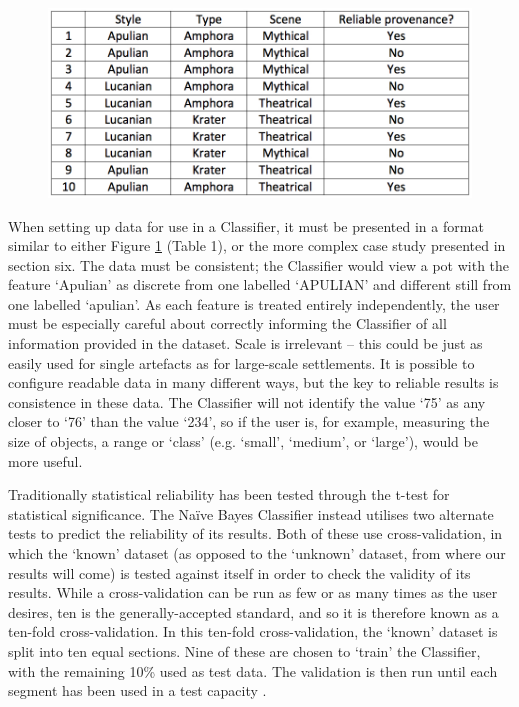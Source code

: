 	\begin{figure}[!htb]
		\includegraphics[width=\linewidth]{figures/thoeming_Table1}
		\label{fig:Table1}
	\end{figure}
	When setting up data for use in a Classifier, it must be presented in a format similar to either Figure \ref{fig:Table1} (Table 1), or the more complex case study presented in section six. The data must be consistent; the Classifier would view a pot with the feature ‘Apulian’ as discrete from one labelled ‘APULIAN’ and different still from one labelled ‘apulian’. As each feature is treated entirely independently, the user must be especially careful about correctly informing the Classifier of all information provided in the dataset. Scale is irrelevant – this could be just as easily used for single artefacts as for large-scale settlements. It is possible to configure readable data in many different ways, but the key to reliable results is consistence in these data. The Classifier will not identify the value ‘75’ as any closer to ‘76’ than the value ‘234’, so if the user is, for example, measuring the size of objects, a range or ‘class’ (e.g. ‘small’, ‘medium’, or ‘large’), would be more useful.
	
	
	Traditionally statistical reliability has been tested through the t-test for statistical significance. The Naïve Bayes Classifier instead utilises two alternate tests to predict the reliability of its results. Both of these use cross-validation, in which the ‘known’ dataset (as opposed to the ‘unknown’ dataset, from where our results will come) is tested against itself in order to check the validity of its results. While a cross-validation can be run as few or as many times as the user desires, ten is the generally-accepted standard, and so it is therefore known as a ten-fold cross-validation. In this ten-fold cross-validation, the ‘known’ dataset is split into ten equal sections. Nine of these are chosen to ‘train’ the Classifier, with the remaining 10\% used as test data. The validation is then run until each segment has been used in a test capacity \parencite[187]{Tan_2006}. 
	
